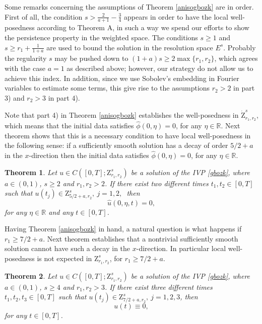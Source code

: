 \documentclass[reqno]{amsart}
\newcommand{\R}{\mathbb R}
\numberwithin{equation}{section}
\newtheorem{theorem}{Theorem}[section]
\begin{document}
Some remarks concerning the assumptions of Theorem \ref{anisogbozk} are in order. First of all, the condition $s>\frac{2}{a+1}-\frac{3}{4}$  appears in order to have the local well-posedness according to Theorem A, in such a way we spend our efforts  to show the persistence property in the weighted space. The conditions $s\geq1$  and $s\geq r_1+\frac{1}{1+a}$ are used to bound the solution in the resolution space $E^s$. Probably the regularity $s$ may be pushed down to $(1+a)s\geq 2\max\{r_1,r_2\}$, which agrees with the case $a=1$ as described above; however, our strategy do not allow us to achieve this index. In addition, since we use Sobolev's embedding in Fourier variables to estimate some terms, this give rise to the assumptions $r_2>2$ in part 3) and $r_2>3$ in part 4).


Note that part 4) in Theorem \ref{anisogbozk} establishes the well-posedness in $\dot{\mathrm{Z}}_{r_{1},r_{2}}^{s}$, which means that the initial data satisfies $\widehat{\phi}(0,\eta)=0$, for any $\eta\in\R$. Next theorem shows that this is a necessary condition to have local well-posedness in the  following sense: if a sufficiently smooth solution has a decay of order $5/2+a$ in the $x$-direction then the initial data satisfies $\widehat{\phi}(0,\eta)=0$, for any $\eta\in\R$.

\begin{theorem}\label{P1}
	Let $u\in C([0,T]; \mathrm{Z}_{r_1,r_2}^{s})$ be a solution of the IVP
	\eqref{gbozk}, where $a \in (0,1)$, $s\geq 2$ and $r_1,r_2>2$.
	If there exist two different times $t_1, t_2 \in [0,T]$ such that $u(t_j)\in \mathrm{Z}_{5/2+a,r_2}^{s}, \ j=1,2, \ $ then $$\hat{u}(0,\eta,t)=0,$$
for any $\eta\in \R$	and any $t\in[0,T]$.
\end{theorem}

Having Theorem \ref{anisogbozk} in hand, a natural question is what happens if $r_1\geq 7/2+a$. Next theorem establishes that a nontrivial sufficiently smooth solution cannot have such a decay in the $x$-direction. In particular local well-posedness is not expected in $\mathrm{Z}^{s}_{r_1,r_2}$, for $r_1\geq 7/2+a$.

\begin{theorem}\label{UCP} Let $u\in C([0,T]; \mathrm{Z}_{r_1,r_2}^{s})$ be a solution of the IVP
	\eqref{gbozk}, where $a \in (0,1)$, $s\geq 4$ and $r_1,r_2>3$. If there exist three different times $t_1, t_2, t_3\in [0,T]$ such
	that $u(t_j)\in \mathrm{Z}_{7/2+a,r_2}^{s}, \ j=1,2,3$, then $$u(t)\equiv 0,$$
	for any $t\in[0,T]$.
\end{theorem}
\end{document}
